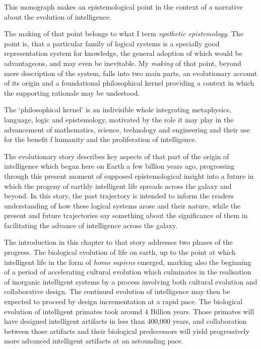 
This monograph makes an epistemological point in the context of a narrative about the evolution of intelligence.

The making of that point belongs to what I term \emph{synthetic epistemology}.
The point is, that a particular family of logical systems is a specially good representation system for knowledge, the general adoption of which would be advantageous, and may even be inevitable.
My \emph{making} of that point, beyond mere description of the system, falls into two main parts, an evolutionary account of its origin and a foundational philosophical kernel providing a context in which the supporting rationale may be undestood.

The `philosophical kernel' is an indivisible whole integrating metaphysics, language, logic and epistemology, motivated by the role it may play in the advancement of mathematics, science, technology and engineering and their use for the benefit f humanity and the proliferation of intelligence.

The evolutionary story describes key aspects of that part of the origin of intelligence which began here on Earth a few billion years ago, progressing through this present moment of supposed epistemological insight into a future in which the progeny of earthly intelligent life spreads across the galaxy and beyond.
In this story, the past trajectory is intended to inform the readers understanding of how these logical systems arose and their nature, while the present and future trajectories say something about the significance of them in facilitating the advance of intelligence across the galaxy.

The introduction in this chapter to that story addresses two phases of the progress.
The biological evolution of life on earth, up to the point at which intelligent life in the form of \emph{homo sapiens} emerged, marking also the beginning of a period of accelerating cultural evolution which culminates in the realisation of inorganic intelligent systems by a process involving both cultural evolution and collaborative design.
The continued evolution of intelligence may then be expected to proceed by design incrementation at a rapid pace.
The biological evolution of intelligent primates took around 4 Billion years.
Those primates will have designed intelligent artifacts in less than 400,000 years, and collaboration between those artifacts and their biological predecessors will yield progressively more advanced intelligent artifacts at an astounding pace.

